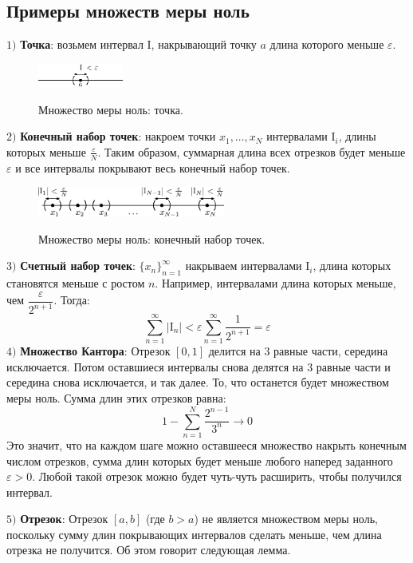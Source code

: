 \documentclass[12pt]{article}
\newcommand{\MI}{\mathrm{I}}
\newcommand{\VE}{\varepsilon}
\theoremstyle{definition}
\begin{document}
\subsection*{Примеры множеств меры ноль}
$1)$ \textbf{Точка}: возьмем интервал $\MI$, накрывающий точку $a$ длина которого меньше $\VE$.
\begin{figure}[H]
	\centering
	\includegraphics[width=0.25\textwidth]{24_2.eps}
	\label{24_2}
	\caption{Множество меры ноль: точка.}
	\label{fig:Множество меры ноль}
\end{figure}
$2)$ \textbf{Конечный набор точек}: накроем точки $x_1,\dotsc, x_N$ интервалами $\MI_i$, длины которых меньше $\tfrac{\VE}{N}$. Таким образом, суммарная длина всех отрезков будет меньше $\VE$ и все интервалы покрывают весь конечный набор точек.
\begin{figure}[H]
	\centering
	\includegraphics[width=0.55\textwidth]{24_3.eps}
	\label{24_3}
	\caption{Множество меры ноль: конечный набор точек.}
	\label{fig:Множество меры ноль}
\end{figure}
$3)$ \textbf{Счетный набор точек}: $\{x_n\}_{n=1}^{\infty}$ накрываем интервалами $\MI_i$, длина которых становятся меньше с ростом $n$. Например, интервалами длина которых меньше, чем $\dfrac{\VE}{2^{n+1}}$. Тогда:
$$
	\sum\limits_{n = 1}^{\infty}|\MI_n| < \VE \sum\limits_{n = 1}^{\infty}\dfrac{1}{2^{n+1}} = \VE
$$
$4)$ \textbf{Множество Кантора}: Отрезок $[0,1]$ делится на $3$ равные части, середина исключается. Потом оставшиеся интервалы снова делятся на $3$ равные части и середина снова исключается, и так далее. То, что останется будет множеством меры ноль. Сумма длин этих отрезков равна:
$$
	1 - \sum\limits_{n=1}^N\dfrac{2^{n-1}}{3^n}\to 0
$$
Это значит, что на каждом шаге можно оставшееся множество накрыть конечным числом отрезков, сумма длин которых будет меньше любого наперед заданного $\VE > 0$. Любой такой отрезок можно будет чуть-чуть расширить, чтобы получился интервал.

$5)$ \textbf{Отрезок}: Отрезок $[a,b]$ (где $b > a$) не является множеством меры ноль, поскольку сумму длин покрывающих интервалов сделать меньше, чем длина отрезка не получится. Об этом говорит следующая лемма.
\end{document}
